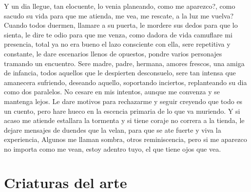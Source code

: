 \documentclass[12pt, a4paper, twoside]{book} %
\begin{document}
Y un dia llegue, tan elocuente, lo venia planeando, como me aparezco?, como sacudo su vida para que me atienda, me vea, me rescate, a la luz me vuelva?
Cuando todos duermen, llamare a su puerta, le mordere sus dedos para que lo sienta, le dire te odio para que me venza, como dadora de vida camuflare mi presencia, total ya no era bueno el lazo consciente con ella, sere repetitiva y constante, le dare escenarios llenos de opuestos, pondre varios personajes tramando  un encuentro.
Sere madre, padre, hermana, amores frescos, una amiga de infancia, todos aquellos que le despierten desconsuelo, sere tan intensa que amanecera sufriendo, deseando aquello, soportando inciertos, replanteando su dia como dos paralelos.
No cesare en mis intentos, aunque me convenza y se mantenga lejos.
Le dare motivos para rechazarme y seguir creyendo que todo es un cuento, pero hare hueco en la escencia primaria de lo que va muriendo.
Y si acaso me atiende estallara la tormenta y si tiene coraje no correra a la tienda, le dejare mensajes de duendes que la velan, para que se ate fuerte y viva la experiencia,
Algunos me llaman sombra, otros reminiscencia, pero si me aparezco no importa como me vean, estoy adentro tuyo, el que tiene ojos que vea.

\chapter{Criaturas del arte}
\end{document}
